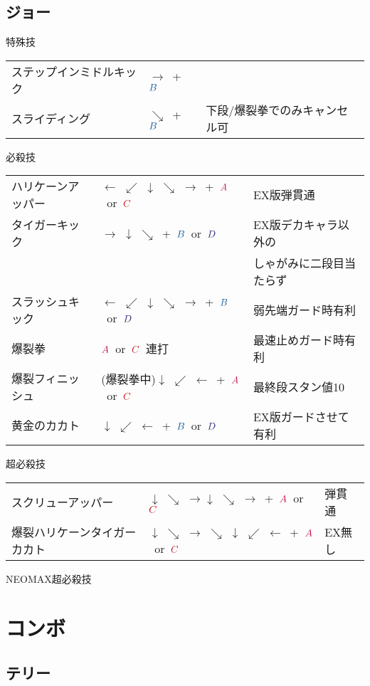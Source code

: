 \documentclass[a4j,11pt]{jarticle}
\def\A{$\textcolor{Acolor}{A}$}
\def\C{$\textcolor{Ccolor}{C}$}
\def\B{$\textcolor{Bcolor}{B}$}
\def\D{$\textcolor{Dcolor}{D}$}
\def\hado{$\downarrow$ $\searrow$ $\rightarrow$}%
\def\tatsu{$\downarrow$ $\swarrow$ $\leftarrow$}%
\def\syoryu{$\rightarrow$ $\downarrow$ $\searrow$}%
\def\yoga{$\leftarrow$ $\swarrow$ $\downarrow$ $\searrow$ $\rightarrow$}%
\def\ryuko{$\downarrow$ $\searrow$ $\rightarrow$ $\searrow$ $\downarrow$ $\swarrow$ $\leftarrow$}%
\begin{document}
\subsection{ジョー}
\begin{itembox}[l]{特殊技}
\begin{tabular}{lll}
ステップインミドルキック&$\rightarrow$\ +\ \B&\\
スライディング&$\searrow$\ +\ \B&下段/爆裂拳でのみキャンセル可
\end{tabular}
\end{itembox}
\begin{itembox}[l]{必殺技}
\begin{tabular}{lll}
ハリケーンアッパー&\yoga\ +\ \A\ or\ \C&EX版弾貫通 \times 3\\
タイガーキック&\syoryu\ +\ \B\ or\ \D&EX版デカキャラ以外の\\
&&しゃがみに二段目当たらず\\
スラッシュキック&\yoga\ +\ \B\ or\ \D&弱先端ガード時有利\\
爆裂拳&\A\ or\ \C\ 連打&最速止めガード時有利\\
爆裂フィニッシュ&(爆裂拳中)\tatsu\ +\ \A\ or\ \C&最終段スタン値10\\
黄金のカカト&\tatsu\ +\ \B\ or\ \D&EX版ガードさせて有利
\end{tabular}
\end{itembox}
\begin{itembox}[l]{超必殺技}
\begin{tabular}{lll}
スクリューアッパー&\hado\hado\ +\ \A\ or\ \C&弾貫通\\
爆裂ハリケーンタイガーカカト&\ryuko\ +\ \A\ or\ \C&EX無し
\end{tabular}
\end{itembox}
\begin{itembox}[l]{NEOMAX超必殺技}
\end{itembox}
\newpage
\section{コンボ}
\subsection{テリー}
\end{document}
